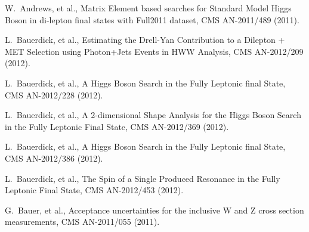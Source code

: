 W.~Andrews, et al., {Matrix Element based searches for Standard Model Higgs Boson in di-lepton final states with Full2011 dataset}, CMS AN-2011/489 (2011).

L.~Bauerdick, et al., {Estimating the Drell-Yan Contribution to a Dilepton + MET Selection using Photon+Jets Events in HWW Analysis}, CMS AN-2012/209 (2012).

L.~Bauerdick, et al., {A Higgs Boson Search in the Fully Leptonic \WW final State}, CMS AN-2012/228 (2012).

L.~Bauerdick, et al., {A 2-dimensional Shape Analysis for the Higgs Boson Search in the Fully Leptonic \WW Final State}, CMS AN-2012/369 (2012).

L.~Bauerdick, et al., {A Higgs Boson Search in the Fully Leptonic \WW final State}, CMS AN-2012/386 (2012).

L.~Bauerdick, et al., {The Spin of a Single Produced Resonance in the Fully Leptonic \WW Final State}, CMS AN-2012/453 (2012).

G.~Bauer, et al., {Acceptance uncertainties for the inclusive W and Z cross section measurements}, CMS AN-2011/055 (2011).

